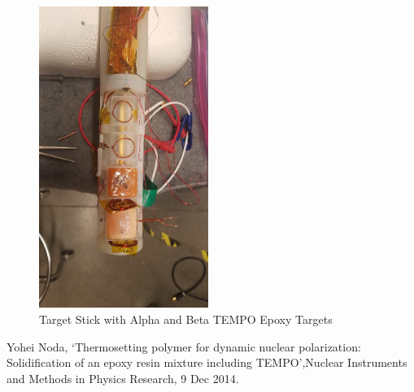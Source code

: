 \documentclass[12pt,epsfig]{article}
\begin{document}
\begin{figure}
\begin{center}
\includegraphics[angle=0,width=0.49\textwidth]{Target}
\caption{\label{ANCHOR} Target Stick with Alpha and Beta TEMPO Epoxy Targets}
\end{center}
\end{figure}

\begin{thebibliography}{2}
 Yohei Noda, `Thermosetting polymer for dynamic nuclear polarization: Solidification of an epoxy resin mixture including TEMPO',Nuclear Instruments and Methods in Physics Research, 9 Dec 2014.
\end{thebibliography}
\end{document}
